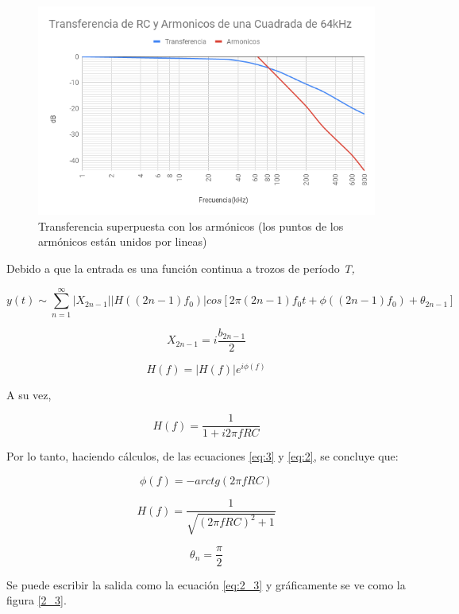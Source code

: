 \begin{figure}[H]
\begin{centering}
\includegraphics[scale=0.65]{../Ex2/resources2/Med_Arm} 
\par\end{centering}
\caption{Transferencia superpuesta con los armónicos (los puntos de los armónicos
están unidos por lineas)}
\end{figure}

Debido a que la entrada es una función continua a trozos de período
\emph{T, }

\[
y(t)\sim\sum_{n=1}^{\infty}\left|X_{2n-1}\right|\left|H\left((2n-1)f_{0}\right)\right|cos\left[2\pi(2n-1)f_{0}t+\phi((2n-1)f_{0})+\theta_{2n-1}\right]
\]

\begin{equation}
X_{2n-1}=i\frac{b_{2n-1}}{2}\label{eq:3}
\end{equation}

\[
H(f)=\left|H(f)\right|e^{i\phi(f)}
\]

A su vez,

\begin{equation}
H(f)=\frac{1}{1+i2\pi fRC}\label{eq:2}
\end{equation}

Por lo tanto, haciendo cálculos, de las ecuaciones \ref{eq:3} y \ref{eq:2},
se concluye que:

\[
\phi(f)=-arctg(2\pi fRC)
\]

\[
H(f)=\frac{1}{\sqrt{(2\pi fRC)^{2}+1}}
\]

\[
\theta_{n}=\frac{\pi}{2}
\]

Se puede escribir la salida como la ecuación \ref{eq:2_3}
y gráficamente se ve como la figura \ref{2_3}.

